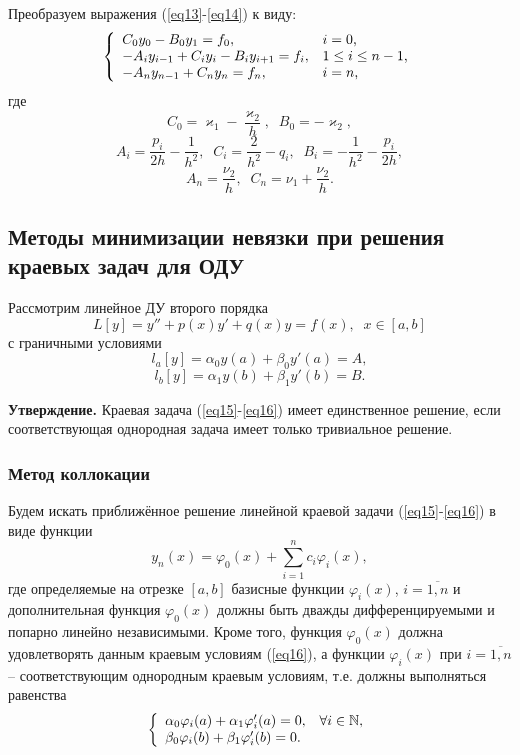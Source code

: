 \documentclass[
11pt,
master, %
subf, %
href, %
colorlinks=true, %
times, %
]{disser}
\begin{document}
Преобразуем выражения (\ref{eq13}-\ref{eq14}) к виду:
$$\left\{
  \begin{array}{ll}
    C_0 y_0 - B_0 y_1 = f_0, & \hbox{$i = 0$,} \\
    -A_i y_{i-1} + C_i y_i - B_i y_{i+1} = f_i, & \hbox{$1 \leq i \leq n-1$,} \\
    -A_n y_{n-1} + C_n y_n = f_n, & \hbox{$i = n$,}
  \end{array}
\right.$$
где
$$C_0 = \varkappa_1 - \frac{\varkappa_2}{h},\;\; B_0 = - \varkappa_2,$$
$$A_i = \frac{p_i}{2h} - \frac{1}{h^2}, \;\; C_i = \frac{2}{h^2} - q_i, \;\; B_i = -\frac{1}{h^2} - \frac{p_i}{2h},$$
$$A_n = \frac{\nu_2}{h}, \;\; C_n = \nu_1 + \frac{\nu_2}{h}.$$

\subsection{Методы минимизации невязки при решения краевых задач для ОДУ}
Рассмотрим линейное ДУ второго порядка
\begin{equation}\label{eq15}
    L[y] = y'' + p(x)y' + q(x)y = f(x),\;\; x\in[a,b]
\end{equation}
с граничными условиями
\begin{equation}\label{eq16}
    l_a[y] = \alpha_0 y(a) + \beta_0 y'(a) = A,
\end{equation}
$$l_b[y] = \alpha_1 y(b) + \beta_1 y'(b) = B.$$

\textbf{Утверждение.} Краевая задача (\ref{eq15}-\ref{eq16}) имеет единственное решение, если соответствующая однородная задача имеет только тривиальное решение.

\subsubsection{Метод коллокации}
Будем искать приближённое решение линейной краевой задачи (\ref{eq15}-\ref{eq16}) в виде функции
\begin{equation}\label{eq17}
    y_n(x) = \varphi_0(x) + \sum_{i=1}^{n}c_i \varphi_i(x),
\end{equation}
где определяемые на отрезке $[a,b]$ базисные функции $\varphi_i(x)$, $i = \overline{1,n}$ и дополнительная функция $\varphi_0(x)$ должны быть дважды дифференцируемыми и попарно линейно независимыми. Кроме того, функция $\varphi_0(x)$ должна удовлетворять данным краевым условиям (\ref{eq16}), а функции $\varphi_i(x)$ при $i = \overline{1,n}$ -- соответствующим однородным краевым условиям, т.е. должны выполняться равенства
\begin{equation}\label{eq18}
\left\{
  \begin{array}{ll}
    \alpha_0 \varphi_i(a) + \alpha_1 \varphi'_i(a) = 0, & \hbox{$\forall i \in \mathbb{N}$}, \\
    \beta_0 \varphi_i(b) + \beta_1 \varphi'_i(b) = 0.
  \end{array}
\right.
\end{equation}
\end{document}
